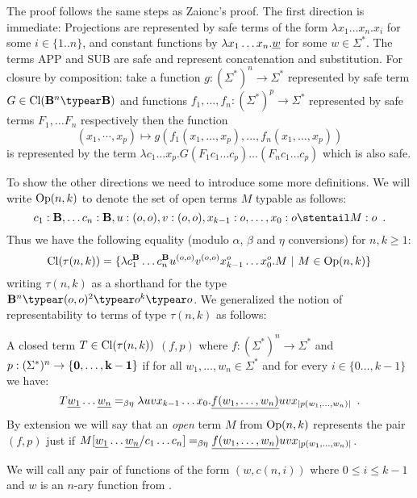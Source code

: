The proof follows the same steps as Zaionc's proof. The first
direction is immediate: Projections are
represented by safe terms of the form $\lambda x_1 \ldots x_n . x_i$
for some $i\in\{1..n\}$, and constant functions by $\lambda x_1
\ldots x_n . \underline{w}$ for some $w\in\Sigma^*$. The terms {\rm APP} and {\rm SUB} are safe and represent concatenation and substitution. For
closure by composition: take a function $g:(\Sigma^*)^n \rightarrow \Sigma^*$
represented by safe term $G\in \closedof{\zaiwordtyp^n \typear
\zaiwordtyp}$ and functions $f_1,\ldots,f_n : (\Sigma^*)^p
\rightarrow \Sigma^*$ represented by safe terms $F_1,\ldots F_n$
respectively then the function $$(x_1,\cdots,x_p) \mapsto
g(f_1(x_1,\ldots,x_p),\ldots,f_n(x_1,\ldots,x_p))$$ is represented
by the term $\lambda c_1\ldots x_p. G (F_1 c_1 \ldots c_p)\ldots
(F_n c_1 \ldots c_p)$ which is also safe.
\bigskip

To show the other directions we need to introduce some more definitions.
We will write ${\rm Op}(n,k)$ to denote the set of open terms
$M$ typable as follows:
$$c_1:\zaiwordtyp, \ldots c_n :\zaiwordtyp, u:(o,o), v:(o,o), x_{k-1}:o, \ldots, x_0 :o \stentail M : o \enspace .$$
Thus we have the following equality (modulo $\alpha$, $\beta$ and
$\eta$ conversions) for $n,k\geq1$:
$${\rm Cl}(\tau(n,k)) = \{ \lambda c_1^{\mathbf{B}} \ldots c_n^{\mathbf{B}} u^{(o,o)} v^{(o,o)} x_{k-1}^o \ldots x_0^o . M \ | \ M \in {\rm Op}(n,k)  \} $$
writing $\tau(n,k)$ as a shorthand for the type
$\zaiwordtyp^n \typear (o,o)^2\typear o^k\typear o$. We generalized the notion of representability to terms
of type $\tau(n,k)$ as follows:
\begin{definition}
A closed term $T\in{\rm Cl}(\tau(n,k))$ 
$(f,p)$ where $f:(\Sigma^*)^n \rightarrow \Sigma^*$ and $p:(\Sigma^*)^n \rightarrow \{\mathbf{0}, \ldots, \mathbf{k-1}\}$ if for all $w_1,\ldots,w_n\in\Sigma^*$
and for every $i\in \{0\ldots,k-1\}$ we have:
$$
T \underline{w_1} \ldots \underline{w_n} =_{\beta\eta} \lambda u v x_{k-1}\ldots x_0 . \underline{f(w_1,\ldots,w_n)} u v x_{|p(w_1,\ldots,w_n)|} \enspace .
$$
By extension we will say that an \emph{open} term $M$ from ${\rm Op}(n,k)$
represents the pair $(f,p)$
 just if $M[\underline{w_1}\ldots \underline{w_n}/c_1\ldots c_n] =_{\beta\eta} \underline{f(w_1,\ldots,w_n)} u v x_{|p(w_1,\ldots,w_n)|}$.
\end{definition}

We will call  any pair of functions of the form
$(w,c(n,i))$ where $0\leq i\leq k-1$ and $w$ is an $n$-ary function
from \safedefset.

